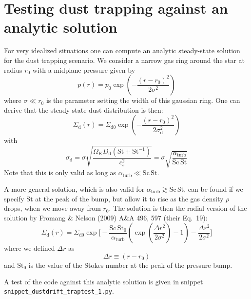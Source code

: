 \documentclass{book}
\newcommand{\code}[1]{{\small\tt #1}}
\begin{document}
\section{Testing dust trapping against an analytic solution}
\label{sec-dust-trap-test}
%
For very idealized situations one can compute an analytic steady-state solution
for the dust trapping scenario. We consider a narrow gas ring around the star at
radius $r_0$ with a midplane pressure given by
\begin{equation}\label{eq-gaussian-pressure-bump}
p(r) = p_0 \exp\left(-\frac{(r-r_0)^2}{2\sigma^2}\right)
\end{equation}
where $\sigma\ll r_0$ is the parameter setting the width of this gaussian ring.
One can derive that the steady state dust distribution is then:
\begin{equation}\label{eq-analytic-sol-radial-trapping}
\Sigma_{\mathrm{d}}(r) = \Sigma_{\mathrm{d0}} \exp\left(-\frac{(r-r_0)^2}{2\sigma_{\mathrm{d}}^2}\right)
\end{equation}
with
\begin{equation}
  \sigma_{\mathrm{d}} = \sigma \sqrt{\frac{\Omega_KD_{\mathrm{d}}(\mathrm{St}+\mathrm{St}^{-1})}{c_s^2}}
  = \sigma\sqrt{\frac{\alpha_{\mathrm{turb}}}{\mathrm{Sc}\,\mathrm{St}}}
\end{equation}
Note that this is only valid as long as $\alpha_{\mathrm{turb}}\ll \mathrm{Sc}\,\mathrm{St}$.

A more general solution, which is also valid for $\alpha_{\mathrm{turb}}\gtrsim
\mathrm{Sc}\,\mathrm{St}$, can be found if we specify $\mathrm{St}$ at the
peak of the bump, but allow it to rise as the gas density $\rho$ drops,
when we move away from $r_0$. The solution is then the radial version of
the solution by Fromang \& Nelson (2009) A\&A 496, 597 (their Eq.~19):
\begin{equation}\label{eq-analytic-sol-radial-trapping-better}
  \Sigma_{\mathrm{d}}(r) = \Sigma_{\mathrm{d0}} \exp\Bigg[
    -\frac{\mathrm{Sc}\,\mathrm{St}_0}{\alpha_{\mathrm{turb}}}
     \left(\exp\left(\frac{\Delta r^2}{2\sigma^2}\right)-1\right)
    -\frac{\Delta r^2}{2\sigma^2}\Bigg]
\end{equation}
where we defined $\Delta r$ as
\begin{equation}
\Delta r \equiv (r-r_0)
\end{equation}
and $\mathrm{St}_0$ is the value of the Stokes number at the peak of the
pressure bump.  

A test of the code against this analytic solution is
given in snippet \code{snippet\_dustdrift\_traptest\_1.py}.
\end{document}
